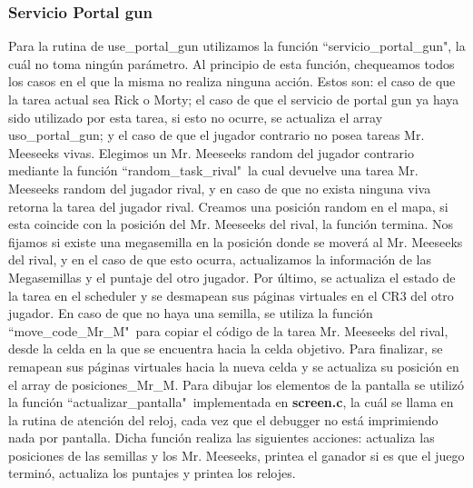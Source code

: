 \documentclass[a4paper]{article}
\begin{document}
\subsubsection{Servicio Portal gun}
\justify
Para la rutina de use_portal_gun utilizamos la función ``servicio_portal_gun", la cuál no toma ningún parámetro. Al principio de esta función, chequeamos todos los casos en el que la misma no realiza ninguna acción. Estos son: el caso de que la tarea actual sea Rick o Morty; el caso de que el servicio de portal gun ya haya sido utilizado por esta tarea, si esto no ocurre, se actualiza el array uso_portal_gun; y el caso de que el jugador contrario no posea tareas Mr. Meeseeks vivas. Elegimos un Mr. Meeseeks random del jugador contrario mediante la función ``random_task_rival"\, la cual devuelve una tarea Mr. Meeseeks random del jugador rival, y en caso de que no exista ninguna viva retorna la tarea del jugador rival. Creamos una posición random en el mapa, si esta coincide con la posición del Mr. Meeseeks del rival, la función termina. Nos fijamos si existe una megasemilla en la posición donde se moverá al Mr. Meeseeks del rival, y en el caso de que esto ocurra, actualizamos la información de las Megasemillas y el puntaje del otro jugador. Por último, se actualiza el estado de la tarea en el scheduler y se desmapean sus páginas virtuales en el CR3 del otro jugador. En caso de que no haya una semilla, se utiliza la función ``move_code_Mr_M"\  para copiar el código de la tarea Mr. Meeseeks del rival, desde la celda en la que se encuentra hacia la celda objetivo. Para finalizar, se remapean sus páginas virtuales hacia la nueva celda y se actualiza su posición en el array de posiciones_Mr_M.
\justify
Para dibujar los elementos de la pantalla se utilizó la función ``actualizar_pantalla"\ implementada en \textbf{screen.c}, la cuál se llama en la rutina de atención del reloj, cada vez que el debugger no está imprimiendo nada por pantalla. Dicha función realiza las siguientes acciones: actualiza las posiciones de las semillas y los Mr. Meeseeks, printea el ganador si es que el juego terminó, actualiza los puntajes y printea los relojes.
\end{document}
